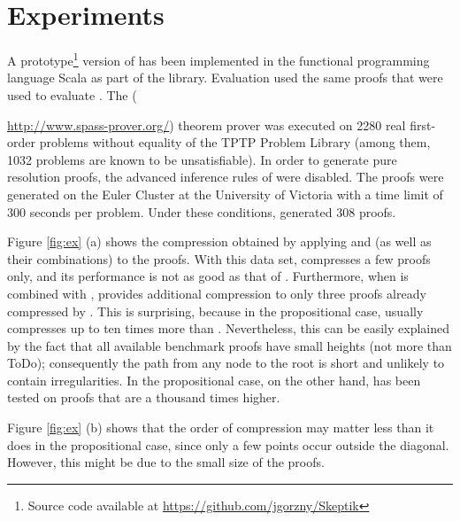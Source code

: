 \section{Experiments} \label{sec:exp}
A prototype\footnote{Source code available at \url{https://github.com/jgorzny/Skeptik}} version of {\FORPI} has been implemented in the functional programming language Scala as part of the \skeptik
library. Evaluation used the same proofs that were used to evaluate {\GFOLU} \cite{GFOLU}.
The {\SPASS} ({\url{http://www.spass-prover.org/}) theorem prover was executed on 2280 real first-order problems without equality of the TPTP Problem Library (among them, 1032 problems are known to be unsatisfiable). In order to generate pure resolution proofs, the advanced inference rules of {\SPASS} were disabled. The proofs were generated on the Euler Cluster at the University of Victoria with a time limit of 300 seconds per problem. Under these conditions, {\SPASS} generated 308 proofs. 


Figure \ref{fig:ex} (a) shows the compression obtained by applying {\FORPI} and {\GFOLU} (as well as their combinations) to the proofs. 
With this data set, {\FORPI} compresses a few proofs only, and its performance is not as good as that of {\GFOLU}. Furthermore, when {\FORPI} is combined with {\GFOLU}, {\FORPI} provides additional compression to only three proofs already compressed by {\GFOLU}. This is surprising, because in the propositional case, {\RPI} usually compresses up to ten times more than {\LowerUnits}. Nevertheless, this can be easily explained by the fact that all available benchmark proofs have small heights (not more than ToDo); consequently the path from any node to the root is short and unlikely to contain irregularities. In the propositional case, on the other hand, {\RPI} has been tested on proofs that are a thousand times higher.

Figure \ref{fig:ex} (b) shows that the order of compression may matter less than it does in the propositional case, since only a few points occur outside the diagonal. However, this might be due to the small size of the proofs.


}
